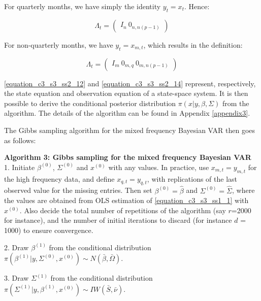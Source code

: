 For quarterly months, we have simply the identity $y_t = x_t$. Hence:

\begin{equation}
\Lambda_t = \left( \begin{matrix} I_n \ 0_{n,n(p-1)} \end{matrix} \right)
\label{equation_c3_s3_ss2_15}
\end{equation}

For non-quarterly months, we have $y_t = x_{m,t}$, which results in the definition:

\begin{equation}
\Lambda_t = \left( \begin{matrix} I_m \ 0_{m,q} \ 0_{m,n(p-1)} \end{matrix} \right)
\label{equation_c3_s3_ss2_16}
\end{equation}

\ref{equation_c3_s3_ss2_12} and \ref{equation_c3_s3_ss2_14} represent, respectively, the state equation and observation equation of a state-space system. It is then possible to derive the conditional posterior distribution $\pi(x| y, \beta, \Sigma)$ from the \cite{Carter1994} algorithm. The details of the algorithm can be found in Appendix \ref{appendix3}.

The Gibbs sampling algorithm for the mixed frequency Bayesian VAR then goes as follows:

\textbf{Algorithm 3: Gibbs sampling for the mixed frequency Bayesian VAR} \vspace{3mm} \\
1. Initiate $\beta^{(0)}$, $\Sigma^{(0)}$ and $x^{(0)}$ with any values. In practice, use $x_{m,t} = y_{m,t}$ for the high frequency data, and define $x_{q,t} = y_{q,t}$, with replications of the last observed value for the missing entries. Then set $\beta^{(0)} = \hat{\beta}$ and $\Sigma^{(0)} = \hat{\Sigma}$, where the values are obtained from OLS estimation of \ref{equation_c3_s3_ss1_1} with $x^{(0)}$. Also decide the total number of repetitions of the algorithm (say $r$=2000 for instance), and the number of initial iterations to discard (for instance $d$ = 1000) to ensure convergence.

2. Draw $\beta^{(1)}$ from the conditional distribution $\pi(\beta^{(1)}| y, \Sigma^{(0)}, x^{(0)} ) \sim N(\bar{\beta}, \bar{\Omega})$.

3. Draw $\Sigma^{(1)}$ from the conditional distribution $\pi(\Sigma^{(1)}| y, \beta^{(1)}, x^{(0)}) \sim IW(\bar{S}, \bar{\nu})$.

